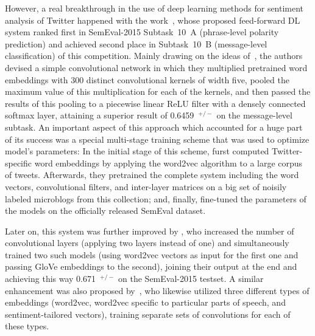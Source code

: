However, a real breakthrough in the use of deep learning methods for
sentiment analysis of Twitter happened with the
work~\citet{Severyn:15}, whose proposed feed-forward DL system ranked
first in SemEval-2015 Subtask~10~A (phrase-level polarity prediction)
\cite{Rosenthal:15} and achieved second place in Subtask~10~B
(message-level classification) of this competition.  Mainly drawing on
the ideas of~\citet{Kalchbrenner:14}, the authors devised a simple
convolutional network in which they multiplied pretrained word
embeddings with 300 distinct convolutional kernels of width five,
pooled the maximum value of this multiplication for each of the
kernels, and then passed the results of this pooling to a piecewise
linear ReLU filter with a densely connected softmax layer, attaining a
superior result of 0.6459~\F$^{+/-}$ on the message-level subtask.  An
important aspect of this approach which accounted for a huge part of
its success was a special multi-stage training scheme that was used to
optimize model's parameters: In the initial stage of this scheme,
\citeauthor{Severyn:15} furst computed Twitter-specific word
embeddings by applying the word2vec algorithm to a large corpus of
tweets.  Afterwards, they pretrained the complete system including the
word vectors, convolutional filters, and inter-layer matrices on a big
set of noisily labeled microblogs from this collection; and, finally,
fine-tuned the parameters of the models on the officially released
SemEval dataset.

Later on, this system was further improved by \citet{Deriu:16}, who
increased the number of convolutional layers (applying two layers
instead of one) and simultaneously trained two such models (using
word2vec vectors as input for the first one and passing GloVe
embeddings to the second), joining their output at the end and
achieving this way 0.671~\F$^{+/-}$ on the SemEval-2015 testset.  A
similar enhancement was also proposed by~\citet{Rouvier:16}, who
likewise utilized three different types of embeddings (word2vec,
word2vec specific to particular parts of speech, and
sentiment-tailored vectors), training separate sets of convolutions
for each of these types.



